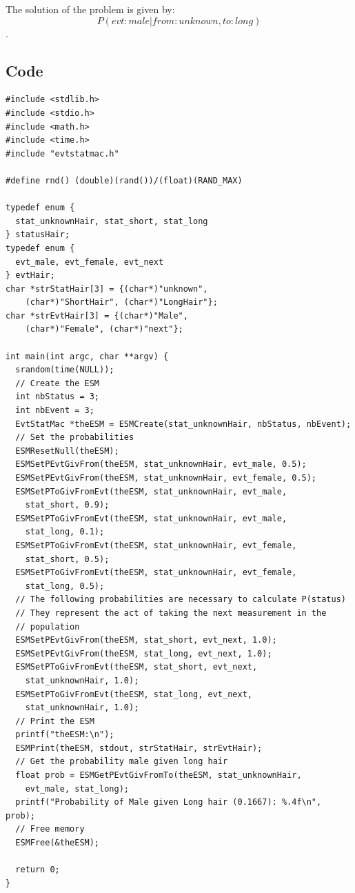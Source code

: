 \documentclass[12pt, a4paper]{article}
\begin{document}
The solution of the problem is given by: $$P(evt:male|from:unknown,to:long)$$.\\

\subsection{Code}

\begin{scriptsize}
\begin{ttfamily}
\begin{lstlisting}
#include <stdlib.h>
#include <stdio.h>
#include <math.h>
#include <time.h>
#include "evtstatmac.h"

#define rnd() (double)(rand())/(float)(RAND_MAX)
 
typedef enum {
  stat_unknownHair, stat_short, stat_long
} statusHair;
typedef enum {
  evt_male, evt_female, evt_next
} evtHair;
char *strStatHair[3] = {(char*)"unknown", 
    (char*)"ShortHair", (char*)"LongHair"};
char *strEvtHair[3] = {(char*)"Male", 
    (char*)"Female", (char*)"next"};

int main(int argc, char **argv) {
  srandom(time(NULL));
  // Create the ESM
  int nbStatus = 3;
  int nbEvent = 3;
  EvtStatMac *theESM = ESMCreate(stat_unknownHair, nbStatus, nbEvent);
  // Set the probabilities
  ESMResetNull(theESM);
  ESMSetPEvtGivFrom(theESM, stat_unknownHair, evt_male, 0.5);
  ESMSetPEvtGivFrom(theESM, stat_unknownHair, evt_female, 0.5);
  ESMSetPToGivFromEvt(theESM, stat_unknownHair, evt_male, 
    stat_short, 0.9);
  ESMSetPToGivFromEvt(theESM, stat_unknownHair, evt_male, 
    stat_long, 0.1);
  ESMSetPToGivFromEvt(theESM, stat_unknownHair, evt_female, 
    stat_short, 0.5);
  ESMSetPToGivFromEvt(theESM, stat_unknownHair, evt_female, 
    stat_long, 0.5);
  // The following probabilities are necessary to calculate P(status)
  // They represent the act of taking the next measurement in the 
  // population
  ESMSetPEvtGivFrom(theESM, stat_short, evt_next, 1.0);
  ESMSetPEvtGivFrom(theESM, stat_long, evt_next, 1.0);
  ESMSetPToGivFromEvt(theESM, stat_short, evt_next, 
    stat_unknownHair, 1.0);
  ESMSetPToGivFromEvt(theESM, stat_long, evt_next, 
    stat_unknownHair, 1.0);
  // Print the ESM
  printf("theESM:\n");
  ESMPrint(theESM, stdout, strStatHair, strEvtHair);
  // Get the probability male given long hair
  float prob = ESMGetPEvtGivFromTo(theESM, stat_unknownHair,
    evt_male, stat_long);
  printf("Probability of Male given Long hair (0.1667): %.4f\n", prob);
  // Free memory
  ESMFree(&theESM);

  return 0;
}
\end{lstlisting}
\end{ttfamily}
\end{scriptsize}
\end{document}
